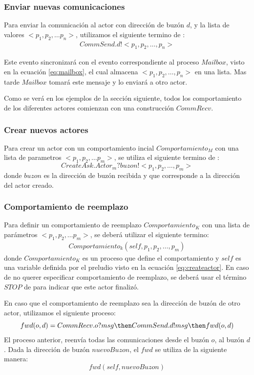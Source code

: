 \subsubsection*{Enviar nuevas comunicaciones}
 Para enviar la comunicación al actor con dirección de buzón $d$, y la lista de valores $<p_1, p_2, \ldots p_n>$, utilizamos el siguiente termino de \CSP:
\begin{align*}
CommSend.d!<p_1, p_2, \ldots, p_n> 
\end{align*}

Este evento sincronizará con el evento correspondiente al proceso $Mailbox$, visto en la ecuación \eqref{eq:mailbox}, el cual almacena $<p_1, p_2, \ldots, p_n>$ en una lista. Mas tarde $Mailbox$ tomará este mensaje y lo enviará a otro actor. 

Como se verá en los ejemplos de la sección siguiente, todos los comportamiento de los diferentes actores comienzan con una construcción $CommRecv$.

\subsubsection*{Crear nuevos actores}
Para crear un actor con un comportamiento incial $Comportamiento_M$ con una lista de parametros $<p_1, p_2, \ldots p_m>$, se utiliza el siguiente termino de \CSP: 
\begin{equation*}
CreateAsk.Actor_m?buzon!<p_1, p_2, \ldots, p_m> 
\end{equation*}	
donde $buzon$ es la dirección de buzón recibida y que corresponde a la dirección del actor creado.

\subsubsection*{Comportamiento de reemplazo}
Para definir un comportamiento de reemplazo $Comportamiento_K$ con una lista de parámetros $<p_1, p_2, \ldots p_m>$, se deberá utilizar el siguiente termino: 
\begin{align*}
Comportamiento_k(self, p_1, p_2, \ldots, p_m) 
\end{align*}	
donde $Comportamiento_K$ es un proceso \CSP que define el comportamiento y $self$ es una variable definida por el preludio visto en la ecuación \eqref{eq:createactor}.
En caso de no querer especificar comportamiento de reemplazo, se deberá usar el término $STOP$ de \CSP para indicar que este actor finalizó.

En caso que el comportamiento de reemplazo sea la dirección de buzón de otro actor, utilizamos   el siguiente proceso:
\begin{equation*}
  fwd(o, d) = CommRecv.o?msg \then CommSend.d!msg \then fwd(o, d)
\end{equation*}
El proceso anterior, reenvía todas las comunicaciones desde el buzón $o$, al buzón $d$. Dada la dirección de buzón $nuevoBuzon$, el $fwd$ se utiliza de la siguiente manera:
\begin{equation*}
  fwd(self, nuevoBuzon)
\end{equation*}


